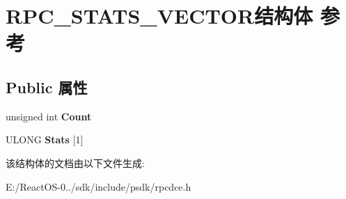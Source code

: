 \hypertarget{struct_r_p_c___s_t_a_t_s___v_e_c_t_o_r}{}\section{R\+P\+C\+\_\+\+S\+T\+A\+T\+S\+\_\+\+V\+E\+C\+T\+O\+R结构体 参考}
\label{struct_r_p_c___s_t_a_t_s___v_e_c_t_o_r}
\subsection*{Public 属性}
\begin{DoxyCompactItemize}
\item 
\mbox{\label{struct_r_p_c___s_t_a_t_s___v_e_c_t_o_r_a3e71131f146d11f68794fd0edef0f6f7}} 
unsigned int {\bfseries Count}
\item 
\mbox{\label{struct_r_p_c___s_t_a_t_s___v_e_c_t_o_r_aa67ab0e43094039c448ac774894da576}} 
U\+L\+O\+NG {\bfseries Stats} \mbox{[}1\mbox{]}
\end{DoxyCompactItemize}


该结构体的文档由以下文件生成\+:\begin{DoxyCompactItemize}
\item 
E\+:/\+React\+O\+S-\/0../sdk/include/psdk/rpcdce.\+h\end{DoxyCompactItemize}
